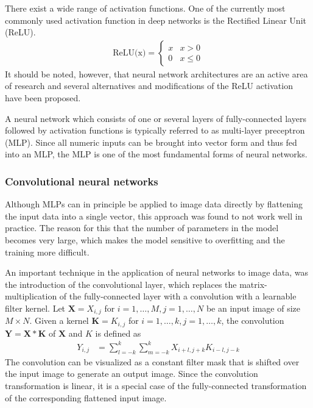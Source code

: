 \begin{description}
  There exist a wide range of activation functions. One of the currently most
  commonly used activation function in deep networks is the Rectified Linear
  Unit (ReLU).
  \begin{align}
    \text{ReLU(x)} = \begin{cases}
      x & x > 0 \\
      0 & x \leq 0
    \end{cases}
  \end{align}
  It should be noted, however, that neural network architectures are an active area of
  research and several alternatives and modifications of the ReLU activation have
  been proposed.

  A neural network which consists of one or several layers of fully-connected
  layers followed by activation functions is typically referred to as
  multi-layer preceptron (MLP). Since all numeric inputs can be brought into
  vector form and thus fed into an MLP, the MLP is one of the most fundamental
  forms of neural networks.

\subsubsection{Convolutional neural networks}

Although MLPs can in principle be applied to image data directly by flattening
the input data into a single vector, this approach was found to not work well in
practice. The reason for this that the number of parameters in the model becomes
very large, which makes the model sensitive to overfitting and the training more
difficult.

An important technique in the application of neural networks to image data, was
the introduction of the convolutional layer, which replaces the
matrix-multiplication of the fully-connected layer with a convolution with a
learnable filter kernel. Let $\bm{X} = X_{i, j}$ for $i = 1, \dots, M, j = 1,
\ldots, N$ be an input image of size $M \times N$. Given a kernel $\bm{K} =
K_{i, j}$ for $i = 1, \ldots, k, j = 1, \ldots, k$, the convolution $\bm{Y} =
\bm{X} * \bm{K}$ of $\bm{X}$ and $K$ is defined as
\begin{align}
  Y_{i, j} &= \sum_{l=-k}^{k} \sum_{m=-k}^{k} X_{i + l, j + k} K_{i - l, j -k}
\end{align}
The convolution can be visualized as a constant filter mask that is shifted over
the input image to generate an output image. Since the convolution
transformation is linear, it is a special case of the fully-connected
transformation of the corresponding flattened input image.


\end{description}
